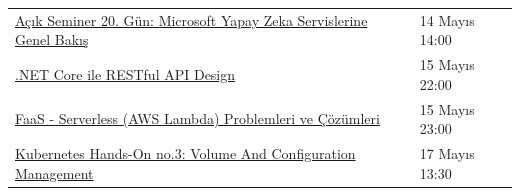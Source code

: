 \documentclass[11pt]{article}
\begin{document}
\begin{longtable}{|p{9.5cm}|l|}
\href{https://kommunity.com/tracikkaynak/events/acik-seminer-20-gun-microsoft-yapay-zeka-servislerine-genel-bakis-2a911429}{Açık Seminer 20. Gün: Microsoft Yapay Zeka Servislerine Genel Bakış} & 14 Mayıs 14:00\\
\href{https://kommunity.com/dotnet-istanbul/events/net-core-ile-restful-api-design-fe171c15}{.NET Core ile RESTful API Design} & 15 Mayıs 22:00\\
\href{https://kommunity.com/cloud-and-serverless-turkey/events/ramazan-ozel-7-faas-serverless-aws-lambda-problemleri-ve-cozumleri-5888dd48}{FaaS - Serverless (AWS Lambda) Problemleri ve Çözümleri} & 15 Mayıs 23:00\\
\href{https://kommunity.com/cloud-and-serverless-turkey/events/kubernetes-hands-on-3-volume-and-configuration-management-2547c2f3}{Kubernetes Hands-On no.3: Volume And Configuration Management} & 17 Mayıs 13:30\\
\hline
\end{longtable}
\end{document}

